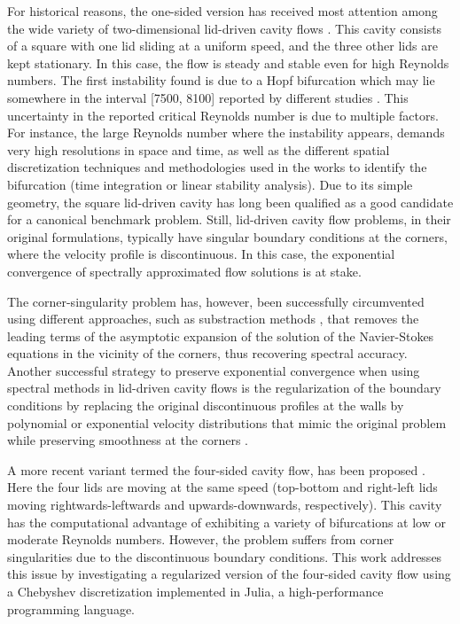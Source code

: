 For historical reasons, the one-sided version has received most attention among
the wide variety of two-dimensional lid-driven cavity flows
\citep{kuhlmann2019}. This cavity consists of a square with one lid sliding at
a uniform speed, and the three other lids are kept stationary. In this case,
the flow is steady and stable even for high Reynolds numbers. The first
instability found is due to a Hopf bifurcation which may lie somewhere in the
interval [7500, 8100] reported by different studies \citep{kuhlmann2019}. This
uncertainty in the reported critical Reynolds number is due to multiple
factors. For instance,  the large Reynolds number where the instability
appears, demands very high resolutions in space and time, as well as the
different spatial discretization techniques and methodologies used in the works
to identify the bifurcation (time integration or linear stability analysis).
Due to its simple geometry, the square lid-driven cavity has long been
qualified as a good candidate for a canonical benchmark problem. Still,
lid-driven cavity flow problems, in their original formulations, typically have
singular boundary conditions at the corners, where the velocity profile is
discontinuous. In this case, the exponential convergence of spectrally
approximated flow solutions is at stake. 

The corner-singularity problem has, however, been successfully circumvented
using different approaches, such as substraction methods \citep{botella1998},
that removes the leading terms of the asymptotic expansion of the solution of
the Navier-Stokes equations in the vicinity of the corners, thus recovering
spectral accuracy. Another successful strategy to preserve exponential
convergence when using spectral methods in lid-driven cavity flows is the
regularization of the boundary conditions by replacing the original
discontinuous profiles at the walls by polynomial or exponential velocity
distributions that mimic the original problem while preserving smoothness at
the corners \citep{shen1991, lopez2017}.

A more recent variant termed the four-sided cavity flow, has been proposed
\citep{wahba2009}. Here the four lids are moving at the same speed (top-bottom
and right-left lids moving rightwards-leftwards and upwards-downwards,
respectively). This cavity has the computational advantage of exhibiting a
variety of bifurcations at low or moderate Reynolds numbers. However, the
problem suffers from corner singularities due to the discontinuous boundary
conditions. This work addresses this issue by investigating a regularized
version of the four-sided cavity flow using a Chebyshev discretization
implemented in Julia, a high-performance programming language.

